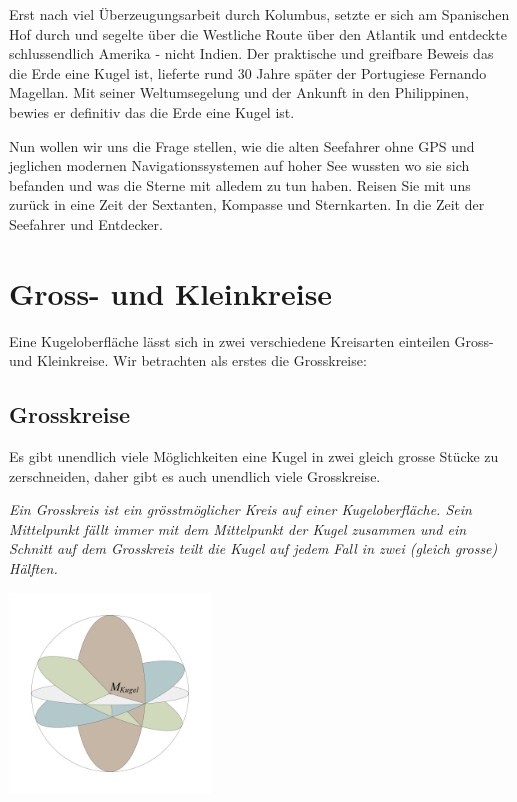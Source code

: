 \begin{refsection}
Erst nach viel Überzeugungsarbeit durch Kolumbus, setzte er sich am Spanischen Hof durch und segelte über die Westliche Route über den Atlantik und entdeckte schlussendlich Amerika - nicht Indien.
Der praktische und greifbare Beweis das die Erde eine Kugel ist, lieferte rund 30 Jahre später der Portugiese Fernando Magellan. Mit seiner Weltumsegelung und der Ankunft in den Philippinen, bewies er definitiv das die Erde eine Kugel ist.

Nun wollen wir uns die Frage stellen, wie die alten Seefahrer ohne GPS und jeglichen modernen Navigationssystemen auf hoher See wussten wo sie sich befanden und was die Sterne mit alledem zu tun haben. Reisen Sie mit uns zurück in eine Zeit der Sextanten, Kompasse und Sternkarten. In die Zeit der Seefahrer und Entdecker.



\section{Gross- und Kleinkreise}
Eine Kugeloberfläche lässt sich in zwei verschiedene Kreisarten einteilen  Gross- und Kleinkreise. 
Wir betrachten als erstes die Grosskreise:

\subsection{Grosskreise}
Es gibt unendlich viele Möglichkeiten eine Kugel in zwei gleich grosse Stücke zu zerschneiden, daher gibt es auch unendlich viele Grosskreise.

\begin{definition}
\textit{Ein Grosskreis ist ein grösstmöglicher Kreis auf einer Kugeloberfläche. Sein Mittelpunkt fällt immer mit dem Mittelpunkt der Kugel zusammen und ein Schnitt auf dem Grosskreis teilt die Kugel auf jedem Fall in zwei (gleich grosse) Hälften.}
\label{skript:kugel:satz:Grosskreis}
\end{definition}

\begin{center}
        \includegraphics[width=0.4\textwidth]{kugel/Grosskreise.jpg}
\end{center}


\end{refsection}
